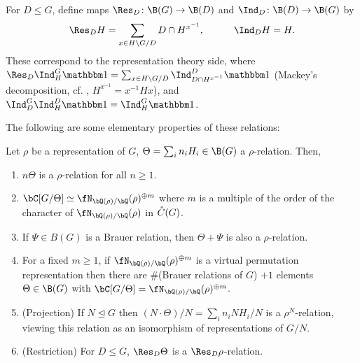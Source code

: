 \begin{defn}
    For $D \leq G$, define maps $\Res_D \colon \B(G) \to \B(D)$ and $\Ind_D \colon \B(D) \to \B(G)$ by
    \[  \Res_D H = \sum_{x \in H \backslash G / D} D \cap H^{x^{-1}}, \qquad \quad \Ind_D H = H. \]
    These correspond to the representation theory side, where $\Res_D \Ind_{H}^G \trivial = \sum_{x \in H \backslash G / D} \Ind_{D \cap H^{x^{-1}}}^D \trivial$ (Mackey's decomposition, cf. \cite[Chapter 7, \S 7.3]{Serre}, $H^{x^{-1}} = x^{-1}H x$), and $\Ind_{D}^G\Ind_{H}^D \trivial = \Ind_{H}^G \trivial$.
\end{defn}

The following are some elementary properties of these relations:

\begin{prop} Let $\rho$ be a representation of $G$, $\Theta = \sum_i n_i H_i \in \B(G)$ a $\rho$-relation. Then,
    \begin{enumerate}
        \item $n \Theta$ is a $\rho$-relation for all $n \geq 1$.
        \item $\bC[G / \Theta] \simeq \repnorm{\rho}^{\oplus m}$ where $m$ is a multiple of the order of the character of $\repnorm{\rho}$ in $\hat{C}(G)$.
        \item If $\Psi \in B(G)$ is a Brauer relation, then $\Theta + \Psi$ is also a $\rho$-relation. 
        \item For a fixed $m \geq 1$, if $\repnorm{\rho}^{\oplus m}$ is a virtual permutation representation then there are $\#$(Brauer relations of $G$) $+ 1$ elements $\Theta \in \B(G)$ with $\bC[G / \Theta] = \repnorm{\rho}^{\oplus m}$.
        
        \item (Projection) If $N \trianglelefteq G$ then $(N \cdot \Theta) / N = \sum_i n_i N H_i / N$ is a $\rho^N$-relation, viewing this relation as an isomorphism of representations of $G / N$.
        \item (Restriction) For $D \leq G$, $\Res_D \Theta$ is a $\Res_D \rho$-relation.
    \end{enumerate}
\end{prop}

